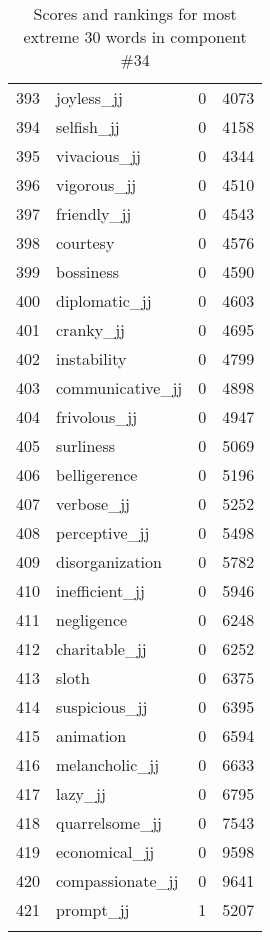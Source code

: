\begin{longtable}[!htbp]{| rlr@{.}l |}
    393 & joyless\_jj & 0 & 4073 \\
    394 & selfish\_jj & 0 & 4158 \\
    395 & vivacious\_jj & 0 & 4344 \\
    396 & vigorous\_jj & 0 & 4510 \\
    397 & friendly\_jj & 0 & 4543 \\
    398 & courtesy & 0 & 4576 \\
    399 & bossiness & 0 & 4590 \\
    400 & diplomatic\_jj & 0 & 4603 \\
    401 & cranky\_jj & 0 & 4695 \\
    402 & instability & 0 & 4799 \\
    403 & communicative\_jj & 0 & 4898 \\
    404 & frivolous\_jj & 0 & 4947 \\
    405 & surliness & 0 & 5069 \\
    406 & belligerence & 0 & 5196 \\
    407 & verbose\_jj & 0 & 5252 \\
    408 & perceptive\_jj & 0 & 5498 \\
    409 & disorganization & 0 & 5782 \\
    410 & inefficient\_jj & 0 & 5946 \\
    411 & negligence & 0 & 6248 \\
    412 & charitable\_jj & 0 & 6252 \\
    413 & sloth & 0 & 6375 \\
    414 & suspicious\_jj & 0 & 6395 \\
    415 & animation & 0 & 6594 \\
    416 & melancholic\_jj & 0 & 6633 \\
    417 & lazy\_jj & 0 & 6795 \\
    418 & quarrelsome\_jj & 0 & 7543 \\
    419 & economical\_jj & 0 & 9598 \\
    420 & compassionate\_jj & 0 & 9641 \\
    421 & prompt\_jj & 1 & 5207 \\
    \hline
    \caption{Scores and rankings for most extreme 30 words in component \#34} \\
\end{longtable}
